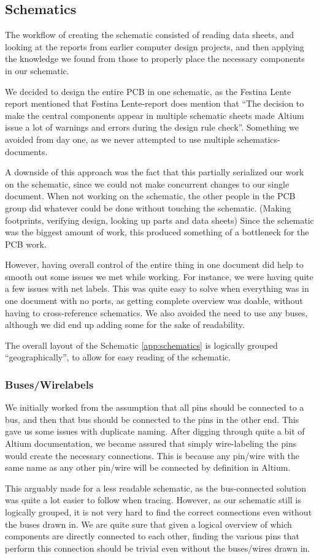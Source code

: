 \subsection {Schematics}
The workflow of creating the schematic consisted of reading data sheets,
and looking at the reports from earlier computer design projects, and then
applying the knowledge we found from those to properly place the necessary
components in our schematic.

We decided to design the entire \ac{PCB} in one schematic, as the Festina Lente
report mentioned that Festina Lente-report does mention that 
``The decision to make the central components appear in multiple schematic
sheets made Altium issue a lot of warnings and errors during the design rule 
check''\cite[p.~49]{berg2011festinalente}. Something we avoided from day one, 
as we never attempted to use multiple schematics-documents.

A downside of this approach was the fact that this partially serialized
our work on the schematic, since we could not make concurrent changes to our
single document. When not working on the schematic, the other people in the
\ac{PCB} group did whatever could be done without touching the
schematic. (Making footprints, verifying design, looking up parts and data
sheets) Since the schematic was the biggest amount of work, this produced
something of a bottleneck for the PCB work.

However, having overall control of the entire thing in one document
did help to smooth out some issues we met while working. For instance,
we were having quite a few issues with net labels. This was quite easy to
solve when everything was in one document with no ports, as getting
complete overview was doable, without having to cross-reference schematics.
We also avoided the need to use any buses, although we did end up adding
some for the sake of readability.

The overall layout of the Schematic \ref{app:schematics} is logically grouped ``geographically'', to
allow for easy reading of the schematic.

\subsubsection {Buses/Wirelabels}
We initially worked from the assumption that all pins should be connected to a
bus, and then that bus should be connected to the pins in the other end. This
gave us some issues with duplicate naming. After digging through quite a bit of
Altium documentation, we became assured that simply wire-labeling the pins
would create the necessary connections. This is because any pin/wire with the
same name as any other pin/wire will be connected by definition in Altium.

This arguably made for a less readable schematic, as the bus-connected solution
was quite a lot easier to follow when tracing. However, as our schematic still
is logically grouped, it is not very hard to find the correct connections even
without the buses drawn in. We are quite sure that given a logical overview of
which components are directly connected to each other, finding the various pins
that perform this connection should be trivial even without the buses/wires
drawn in.
